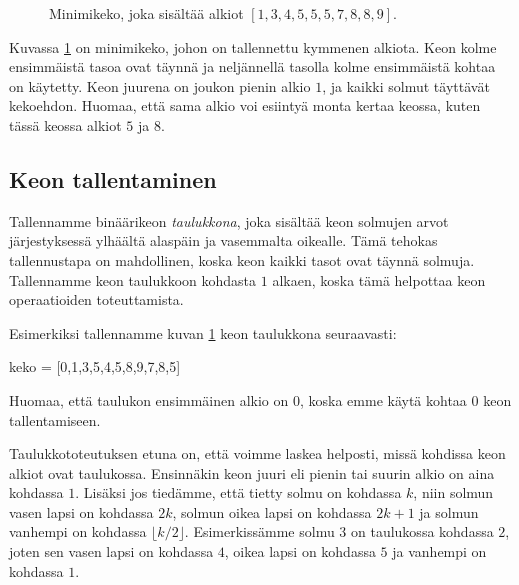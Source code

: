 \begin{figure}
\center
{}
\caption{Minimikeko, joka sisältää alkiot $[1,3,4,5,5,5,7,8,8,9]$.}
\label{fig:minkek}
\end{figure}

Kuvassa \ref{fig:minkek} on minimikeko,
johon on tallennettu kymmenen alkiota.
Keon kolme ensimmäistä tasoa ovat täynnä
ja neljännellä tasolla kolme ensimmäistä kohtaa on käytetty.
Keon juurena on joukon pienin alkio $1$,
ja kaikki solmut täyttävät kekoehdon.
Huomaa, että sama alkio voi esiintyä monta kertaa keossa,
kuten tässä keossa alkiot $5$ ja $8$.

\subsection{Keon tallentaminen}

Tallennamme binäärikeon \emph{taulukkona},
joka sisältää keon solmujen arvot jär\-jestyksessä
ylhäältä alaspäin ja vasemmalta oikealle.
Tämä tehokas tallennustapa on mahdollinen,
koska keon kaikki tasot ovat täynnä solmuja.
Tallennamme keon taulukkoon kohdasta $1$ alkaen,
koska tämä helpottaa keon operaatioiden toteuttamista.

Esimerkiksi tallennamme kuvan \ref{fig:minkek}
keon taulukkona seuraavasti:

\begin{code}
keko = [0,1,3,5,4,5,8,9,7,8,5]
\end{code}

Huomaa, että taulukon ensimmäinen alkio on $0$,
koska emme käytä kohtaa $0$ keon tallentamiseen.

Taulukkototeutuksen etuna on, että voimme laskea
helposti, missä kohdissa keon alkiot ovat taulukossa.
Ensinnäkin keon juuri eli pienin tai suurin alkio
on aina kohdassa $1$.
Lisäksi jos tiedämme, että tietty solmu on kohdassa $k$,
niin solmun vasen lapsi on kohdassa $2k$,
solmun oikea lapsi on kohdassa $2k+1$ ja
solmun vanhempi on kohdassa $\lfloor k/2 \rfloor$.
Esimerkissämme solmu $3$
on taulukossa kohdassa $2$,
joten sen vasen lapsi on kohdassa $4$,
oikea lapsi on kohdassa $5$ ja
vanhempi on kohdassa $1$.

